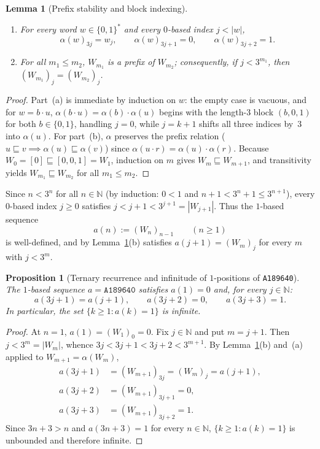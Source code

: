 \documentclass[11pt]{article}
\newtheorem{proposition}[theorem]{Proposition}
\newtheorem{lemma}[theorem]{Lemma}
\theoremstyle{definition}
\newcommand{\N}{\mathbb{N}}
\newcommand{\seq}[1]{\texttt{#1}}
\begin{document}
\begin{lemma}[Prefix stability and block indexing]
\label{lem:morph-block}
\begin{enumerate}
\item[\textup{(a)}] For every word $w \in \{0, 1\}^*$ and every $0$-based index $j < |w|$,
\[
\alpha(w)_{3j} = w_j, \qquad \alpha(w)_{3j+1} = 0, \qquad \alpha(w)_{3j+2} = 1.
\]
\item[\textup{(b)}] For all $m_1 \le m_2$, $W_{m_1}$ is a prefix of $W_{m_2}$; consequently, if $j < 3^{m_1}$, then $(W_{m_1})_j = (W_{m_2})_j$.
\end{enumerate}
\end{lemma}

\begin{proof}
Part~(a) is immediate by induction on $w$: the empty case is vacuous, and for $w = b \cdot u$, $\alpha(b \cdot u) = \alpha(b) \cdot \alpha(u)$ begins with the length-$3$ block $(b, 0, 1)$ for both $b \in \{0, 1\}$, handling $j = 0$, while $j = k + 1$ shifts all three indices by~$3$ into $\alpha(u)$. For part~(b), $\alpha$ preserves the prefix relation ($u \sqsubseteq v \implies \alpha(u) \sqsubseteq \alpha(v)$) since $\alpha(u \cdot r) = \alpha(u) \cdot \alpha(r)$. Because $W_0 = [0] \sqsubseteq [0, 0, 1] = W_1$, induction on $m$ gives $W_m \sqsubseteq W_{m+1}$, and transitivity yields $W_{m_1} \sqsubseteq W_{m_2}$ for all $m_1 \le m_2$.
\end{proof}

Since $n < 3^n$ for all $n \in \N$ (by induction: $0 < 1$ and $n + 1 < 3^n + 1 \le 3^{n+1}$), every $0$-based index $j \ge 0$ satisfies $j < j + 1 < 3^{j+1} = |W_{j+1}|$. Thus the $1$-based sequence
\[
a(n) := (W_n)_{n-1} \qquad (n \ge 1)
\]
is well-defined, and by Lemma~\ref{lem:morph-block}(b) satisfies $a(j + 1) = (W_m)_j$ for every $m$ with $j < 3^m$.

\begin{proposition}[Ternary recurrence and infinitude of $1$-positions of \seq{A189640}]
\label{prop:a189640-rec}
The $1$-based sequence $a = \seq{A189640}$ satisfies $a(1) = 0$ and, for every $j \in \N$:
\begin{equation}
\label{eq:a189640-rec}
a(3j + 1) = a(j + 1), \qquad a(3j + 2) = 0, \qquad a(3j + 3) = 1.
\end{equation}
In particular, the set $\{k \ge 1 : a(k) = 1\}$ is infinite.
\end{proposition}

\begin{proof}
At $n = 1$, $a(1) = (W_1)_0 = 0$. Fix $j \in \N$ and put $m = j + 1$. Then $j < 3^m = |W_m|$, whence $3j < 3j + 1 < 3j + 2 < 3^{m+1}$. By Lemma~\ref{lem:morph-block}(b) and~(a) applied to $W_{m+1} = \alpha(W_m)$,
\begin{align*}
a(3j + 1) &= (W_{m+1})_{3j} = (W_m)_j = a(j + 1), \\
a(3j + 2) &= (W_{m+1})_{3j+1} = 0, \\
a(3j + 3) &= (W_{m+1})_{3j+2} = 1.
\end{align*}
Since $3n + 3 > n$ and $a(3n + 3) = 1$ for every $n \in \N$, $\{k \ge 1 : a(k) = 1\}$ is unbounded and therefore infinite.
\end{proof}
\end{document}
